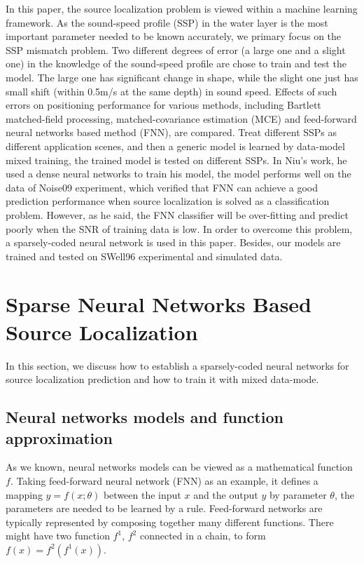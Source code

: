 In this paper, the source localization problem is viewed within a machine learning
framework. As the sound-speed profile (SSP) in the water layer is the most important parameter needed to be known accurately\cite{feuillade1989environmental}, we primary focus on the SSP
mismatch problem.
Two different degrees of error (a large one and a slight one) in the knowledge of the sound-speed profile are chose to train and test the model.
The large one has significant change in shape, while the slight one just has small shift (within 0.5m/s at the same depth) in sound speed.
Effects of such errors on positioning performance for various methods, including Bartlett matched-field processing, matched-covariance estimation (MCE) and feed-forward neural networks based method (FNN), are compared.
Treat different SSPs as different application scenes, and then a generic model is learned by data-model mixed training, the trained model is tested on
different SSPs.
In Niu's work\cite{niu2017source}, he used a dense neural networks to train his model, the model performs well on the data of Noise09 experiment, which verified that FNN can achieve a good prediction performance when source localization is solved as a classification problem. However, as he said, the FNN classifier will be over-fitting and predict poorly when the SNR of training data is low. In order to overcome this problem,
a sparsely-coded neural network is used in this paper. Besides, our models are trained and tested on SWell96 experimental and simulated data.

\section{Sparse Neural Networks Based Source Localization}
In this section, we discuss how to establish a sparsely-coded neural networks for
source localization prediction and how to train it with mixed data-mode.

\subsection{Neural networks models and function approximation}
As we known, neural networks models can be viewed as a mathematical function $f$. Taking feed-forward neural network (FNN) as an example, it defines a mapping ${{y}}=f(x;\theta )$ between the input $x$ and the output $y$ by parameter $\theta$, the parameters are needed to be learned by a rule. Feed-forward networks are typically represented by composing together many different functions. There might have two function $f^{1}$, $f^{2}$ connected in a chain\cite{goodfellow2016deep}, to form
$f(x) = f^{2}(f^{1}(x))$.

